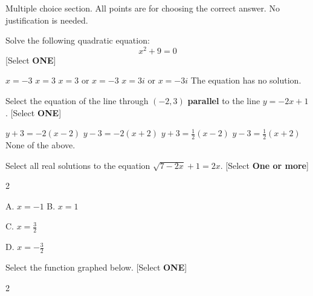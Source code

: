 Multiple choice section. All points are for choosing the correct answer. No justification is needed.
\begin{questions} 

\question[3] %

Solve the following quadratic equation:\\
\[x^2+9=0\] [Select \textbf{ONE}]
\begin{checkboxes}
    \choice $x=-3$
    \choice $x=3$
    \choice $x=3$ or $x=-3$
    \choice $x=3i$ or $x=-3i$
    \choice The equation has no solution.
\end{checkboxes}


\question[3] Select the equation of the line through $(-2 , 3)$ \textbf{parallel} to the line $y=-2x+1$. [Select \textbf{ONE}]
\begin{choices}
   \choice \chooseone $y + 3=-2(x-2)$
   \choice \chooseone $y - 3=-2(x+2)$
   \choice \chooseone $y + 3=\frac{1}{2}(x-2)$
   \choice \chooseone $y - 3=\frac{1}{2}(x+2)$
   \choice \chooseone None of the above.
\end{choices}
\question[3] Select all real solutions to the equation $\sqrt{7-2x}+1=2x$. [Select \textbf{One or more}]
    \begin{multicols}{2}
    \checkboxchar{\Large$\Box$}\begin{checkboxes}
    
    \choice \hspace{-3em} A.\hspace{1.2em} $x=-1$
        \choice \hspace{-3em} B.\hspace{1.2em} $x=1$
    
        \choice \hspace{-3em} C. \hspace{1.2em}$x=\frac{3}{2}$
    
        \choice \hspace{-3em} D.\hspace{1.2em} $x=-\frac{3}{2}$
        
        \end{checkboxes}
    \end{multicols}

\question[3] Select the function graphed below. [Select \textbf{ONE}]

\begin{multicols}{2}
    


\end{multicols}
\end{questions}
